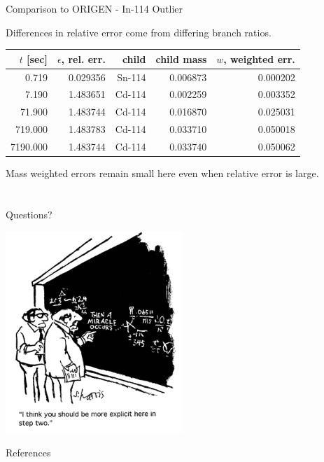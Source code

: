 \documentclass[xcolor=x11names,compress]{beamer}
\begin{document}

\begin{frame}{Comparison to ORIGEN - In-114 Outlier}

    Differences in relative error come from differing branch ratios.

    \begin{center}
    \begin{tabular}{rrrrr}
    \hline
 $t$ [sec] & $\epsilon$, rel. err. &      child & child mass &  $w$, weighted err. \\
\hline
     0.719 &  0.029356 &  Sn-114 &   0.006873 &     0.000202 \\
     7.190 &  1.483651 &  Cd-114 &   0.002259 &     0.003352 \\
    71.900 &  1.483744 &  Cd-114 &   0.016870 &     0.025031 \\
   719.000 &  1.483783 &  Cd-114 &   0.033710 &     0.050018 \\
  7190.000 &  1.483744 &  Cd-114 &   0.033740 &     0.050062 \\
    \hline
    \end{tabular}
    \end{center}

    \vspace*{1em}
    Mass weighted errors remain small here even when relative error is large.

\end{frame}


\section*{}
\begin{frame}[fragile]{Questions?}

    \begin{center}
    \includegraphics[height=3in,clip]{questions-comic.png}
    \end{center}

\end{frame}

\begin{frame}[allowframebreaks]{References}
	
    
\end{frame}
\end{document}
